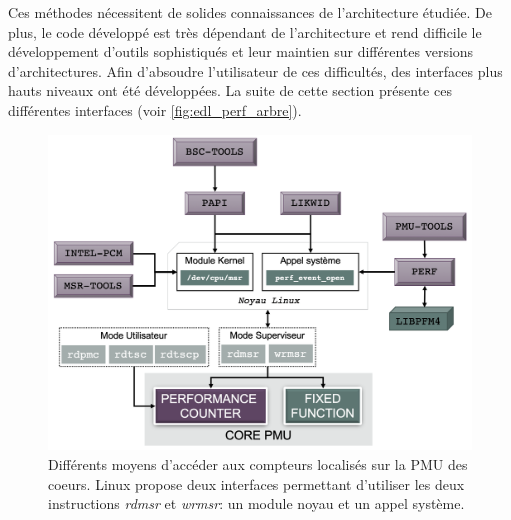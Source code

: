         Ces méthodes nécessitent de solides connaissances de l'architecture étudiée. De plus, le code développé est très dépendant de l'architecture et rend difficile le développement d'outils sophistiqués et leur maintien sur différentes versions d'architectures. Afin d'absoudre l'utilisateur de ces difficultés, des interfaces plus hauts niveaux ont été développées. La suite de cette section présente ces différentes interfaces (voir \autoref{fig:edl_perf_arbre}).
            
            \begin{figure}[h]
            \center
            \includegraphics[width=14cm]{images/edl_perf_arbre.png}
            \caption{\label{fig:edl_perf_arbre} Différents moyens d'accéder aux compteurs localisés sur la PMU des coeurs. Linux propose deux interfaces permettant d'utiliser les deux instructions \textit{rdmsr} et \textit{wrmsr}: un module noyau et un appel système.}
            \end{figure}
           
